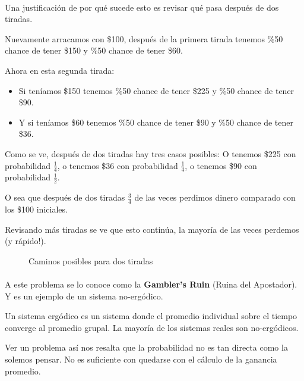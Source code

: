 \documentclass[../main.tex]{subfiles}
\begin{document}
\paragraph{} Una justificación de por qué sucede esto es revisar qué pasa después de dos tiradas.

Nuevamente arracamos con \$100, después de la primera tirada tenemos \%50 chance de tener \$150 y \%50 chance de tener \$60.

Ahora en esta segunda tirada:
\begin{itemize}
  \item Si teníamos \$150 tenemos \%50 chance de tener \$225 y \%50 chance de tener \$90.
  \item Y si teníamos \$60 tenemos \%50 chance de tener \$90 y \%50 chance de tener \$36.
\end{itemize}

Como se ve, después de dos tiradas hay tres casos posibles: O tenemos \$225 con probabilidad \(\frac{1}{4}\), o tenemos \$36 con probabilidad \(\frac{1}{4}\), o tenemos \$90 con probabilidad \(\frac{1}{2}\).

O sea que después de dos tiradas \(\frac{3}{4}\) de las veces perdimos dinero comparado con los \$100 iniciales.

Revisando más tiradas se ve que esto continúa, la mayoría de las veces perdemos (y rápido!).

\begin{figure}[H]
  \centering
  \caption{Caminos posibles para dos tiradas}
\end{figure}

\paragraph{} A este problema se lo conoce como la \textbf{Gambler's Ruin} (Ruina del Apostador). Y es un ejemplo de un sistema no-ergódico.

Un sistema ergódico es un sistema donde el promedio individual sobre el tiempo converge al promedio grupal.  La mayoría de los sistemas reales son no-ergódicos.

Ver un problema así nos resalta que la probabilidad no es tan directa como la solemos pensar. No es suficiente con quedarse con el cálculo de la ganancia promedio.
\end{document}
